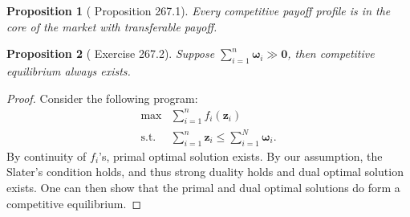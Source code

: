 \documentclass[openany]{book}
\newtheorem{proposition}{Proposition}[chapter]
\theoremstyle{remark}
\begin{document}
\begin{proposition}[\cite{OR94} Proposition 267.1]
    Every competitive payoff profile is in the core of the market with transferable payoff.
\end{proposition}
\begin{proposition}[\cite{OR94} Exercise 267.2]
    Suppose $\sum_{i=1}^{n}\boldsymbol{\omega}_i\gg \mathbf{0}$, then competitive equilibrium always exists.
\end{proposition}
\begin{proof}
    Consider the following program:
    \begin{equation}
        \begin{array}{rl}
            \mathrm{max} & \sum_{i=1}^{n}f_i(\boldsymbol{z}_i) \\
            \mathrm{s.t.} & \sum_{i=1}^{n}\boldsymbol{z}_i\le \sum_{i=1}^{N}\boldsymbol{\omega}_i.
        \end{array}
    \end{equation}
    By continuity of $f_i$'s, primal optimal solution exists. By our assumption, the Slater's condition holds, and thus strong duality holds and dual optimal solution exists. One can then show that the primal and dual optimal solutions do form a competitive equilibrium.
\end{proof}
\end{document}
